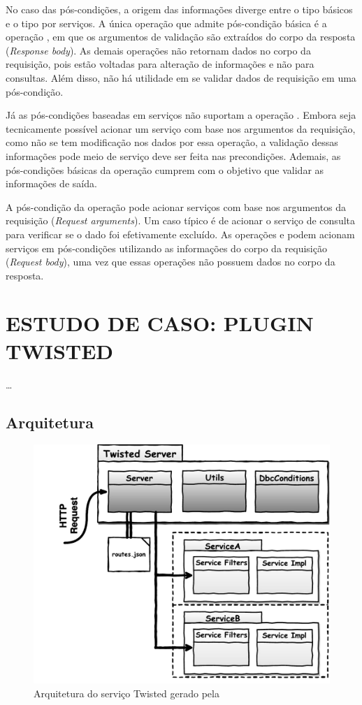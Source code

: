 No caso das pós-condições, a origem das informações diverge entre o tipo
básicos e o tipo por serviços. A única operação que admite pós-condição básica é
a operação , em que os argumentos de validação são extraídos do
corpo da resposta (\textit{Response body}). As demais operações não retornam dados
no corpo da requisição, pois estão voltadas para alteração de informações e não
para consultas. Além disso, não há utilidade em se validar dados de requisição
em uma pós-condição.

Já as pós-condições baseadas em serviços não suportam a operação .
Embora seja tecnicamente possível acionar um serviço com base nos argumentos da
requisição, como não se tem modificação nos dados por essa operação, a
validação dessas informações pode meio de serviço deve ser feita nas
precondições. Ademais, as pós-condições básicas da operação  cumprem
com o objetivo que validar as informações de saída.

A pós-condição da operação  pode acionar serviços com base nos
argumentos da requisição (\textit{Request arguments}). Um caso típico é de
acionar o serviço de consulta para verificar se o dado foi efetivamente
excluído. As operações  e  podem acionam serviços em
pós-condições utilizando as informações do corpo da requisição (\textit{Request
body}), uma vez que essas operações não possuem dados no corpo da resposta. 



\section{ESTUDO DE CASO: PLUGIN TWISTED}
\label{pluginTwisted}

\ldots

\subsection{Arquitetura}

\begin{figure}[!htb]
\centering
\includegraphics[width=120mm,trim = 18mm 4mm 0mm
0mm,clip]{img/TwistedServer.pdf}
\caption{Arquitetura do serviço Twisted gerado pela \neoidl{}}
\label{Fig:TwistedArchtecture}
\end{figure}


